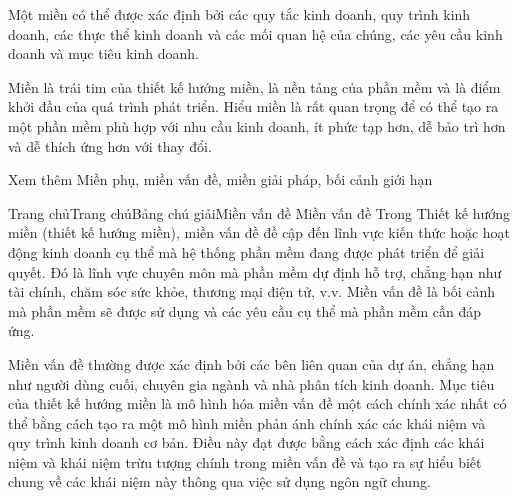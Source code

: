 Một miền có thể được xác định bởi các quy tắc kinh doanh, quy trình kinh doanh, các thực thể kinh doanh và các mối quan hệ của chúng, các yêu cầu kinh doanh và mục tiêu kinh doanh.

Miền là trái tim của thiết kế hướng miền, là nền tảng của phần mềm và là điểm khởi đầu của quá trình phát triển. Hiểu miền là rất quan trọng để có thể tạo ra một phần mềm phù hợp với nhu cầu kinh doanh, ít phức tạp hơn, dễ bảo trì hơn và dễ thích ứng hơn với thay đổi.

Xem thêm	 Miền phụ, miền vấn đề, miền giải pháp, bối cảnh giới hạn


Trang chủTrang chủBảng chú giảiMiền vấn đề
Miền vấn đề
Trong Thiết kế hướng miền (thiết kế hướng miền), miền vấn đề đề cập đến lĩnh vực kiến thức hoặc hoạt động kinh doanh cụ thể mà hệ thống phần mềm đang được phát triển để giải quyết. Đó là lĩnh vực chuyên môn mà phần mềm dự định hỗ trợ, chẳng hạn như tài chính, chăm sóc sức khỏe, thương mại điện tử, v.v. Miền vấn đề là bối cảnh mà phần mềm sẽ được sử dụng và các yêu cầu cụ thể mà phần mềm cần đáp ứng.

Miền vấn đề thường được xác định bởi các bên liên quan của dự án, chẳng hạn như người dùng cuối, chuyên gia ngành và nhà phân tích kinh doanh. Mục tiêu của thiết kế hướng miền là mô hình hóa miền vấn đề một cách chính xác nhất có thể bằng cách tạo ra một mô hình miền phản ánh chính xác các khái niệm và quy trình kinh doanh cơ bản. Điều này đạt được bằng cách xác định các khái niệm và khái niệm trừu tượng chính trong miền vấn đề và tạo ra sự hiểu biết chung về các khái niệm này thông qua việc sử dụng ngôn ngữ chung.

